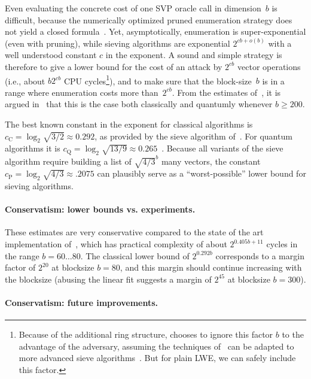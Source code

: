 Even evaluating the concrete cost of one SVP oracle call in
dimension~$b$ is difficult, because the numerically optimized pruned
enumeration strategy does not yield a closed
formula~\cite{EC:GamNguReg10,AC:CheNgu11}. Yet, asymptotically,
enumeration is super-exponential (even with pruning), while sieving
algorithms are exponential $2^{cb + o(b)}$ with a well understood
constant $c$ in the exponent. A sound and simple strategy is therefore
to give a lower bound for the cost of an attack by $2^{cb}$ vector
operations (i.e., about $b 2^{cb}$ CPU cycles\footnote{Because of the
  additional ring structure, \cite{USENIX:ADPS16} chooses to ignore
  this factor $b$ to the advantage of the adversary, assuming the
  techniques of~\cite{AFRICACRYPT:Schneider13,BNP_IJAC16} can be
  adapted to more advanced sieve algorithms~\cite{USENIX:ADPS16}. But
  for plain LWE, we can safely include this factor.}), and to make
sure that the block-size~$b$ is in a range where enumeration costs
more than~$2^{cb}$. From the estimates of~\cite{AC:CheNgu11}, it is
argued in~\cite{USENIX:ADPS16} that this is the case both classically
and quantumly whenever $b \geq 200$.

The best known constant in the exponent for classical algorithms is
$c_{\text{C}} = \log_2 \sqrt{3/2} \approx 0.292$, as provided by the
sieve algorithm of~\cite{SODA:BDGL16}.  For quantum algorithms it is
$c_{\text{Q}} = \log_2 \sqrt{13/9} \approx
0.265$~\cite[Sec. 14.2.10]{LaarhovenThesis}. Because all variants of
the sieve algorithm require building a list of $\sqrt{4/3}^b$ many
vectors, the constant
$c_{\text{P}} = \log_2 \sqrt{4/3} \approx {.2075}$ can plausibly serve
as a ``worst-possible'' lower bound for sieving algorithms.

\paragraph{Conservatism: lower bounds vs. experiments.}

These estimates are very conservative compared to the state of the art
implementation of~\cite{mariano2017parallel}, which has practical
complexity of about $2^{0.405 b + 11}$ cycles in the range
$b=60 \dots 80$. The classical lower bound of $2^{0.292b}$ corresponds
to a margin factor of $2^{20}$ at blocksize $b=80$, and this margin
should continue increasing with the blocksize (abusing the linear fit
suggests a margin of $2^{45}$ at blocksize $b=300$).

\paragraph{Conservatism: future improvements.}

